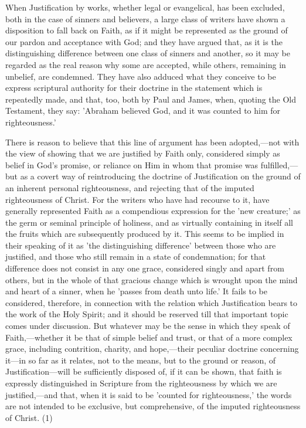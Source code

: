 \documentclass[
]{book}
\begin{document}
When Justification by works, whether legal or evangelical, has been excluded, both in the case of sinners and believers, a large class of writers have shown a disposition to fall back on Faith, as if it might be represented as the ground of our pardon and acceptance with God; and they have argued that, as it is the distinguishing difference between one class of sinners and another, so it may be regarded as the real reason why some are accepted, while others, remaining in unbelief, are condemned. They have also adduced what they conceive to be express scriptural authority for their doctrine in the statement which is repeatedly made, and that, too, both by Paul and James, when, quoting the Old Testament, they say: 'Abraham believed God, and it was counted to him for righteousness.'

There is reason to believe that this line of argument has been adopted,---not with the view of showing that we are justified by Faith only, considered simply as belief in God's promise, or reliance on Him in whom that promise was fulfilled,---but as a covert way of reintroducing the doctrine of Justification on the ground of an inherent personal righteousness, and rejecting that of the imputed righteousness of Christ. For the writers who have had recourse to it, have generally represented Faith as a compendious expression for the 'new creature;' as the germ or seminal principle of holiness, and as virtually containing in itself all the fruits which are subsequently produced by it. This seems to be implied in their speaking of it as 'the distinguishing difference' between those who are justified, and those who still remain in a state of condemnation; for that difference does not consist in any one grace, considered singly and apart from others, but in the whole of that gracious change which is wrought upon the mind and heart of a sinner, when he 'passes from death unto life.' It fails to be considered, therefore, in connection with the relation which Justification bears to the work of the Holy Spirit; and it should be reserved till that important topic comes under discussion. But whatever may be the sense in which they speak of Faith,---whether it be that of simple belief and trust, or that of a more complex grace, including contrition, charity, and hope,---their peculiar doctrine concerning it---in so far as it relates, not to the means, but to the ground or reason, of Justification---will be sufficiently disposed of, if it can be shown, that faith is expressly distinguished in Scripture from the righteousness by which we are justified,---and that, when it is said to be 'counted for righteousness,' the words are not intended to be exclusive, but comprehensive, of the imputed righteousness of Christ. (1)
\end{document}
